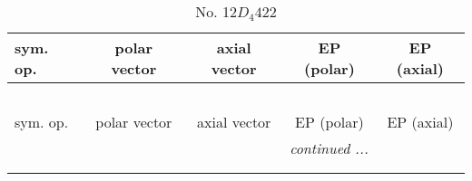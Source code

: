 \documentclass[fleqn,10pt,landscape]{jsarticle}
\begin{document}
\begin{center}
\renewcommand{\arraystretch}{1.3}
\begin{longtable}{lcccc}
\caption{No. 12\quad$D_{4}$\quad$422$\quad[ tetragonal ]}
 \\
 \hline \hline
sym. op. & polar vector & axial vector & EP (polar) & EP (axial) \\ \hline \endfirsthead

\multicolumn{4}{l}{\tablename\ \thetable{}} \\
 \hline \hline
sym. op. & polar vector & axial vector & EP (polar) & EP (axial) \\ \hline \endhead

 \hline \hline
\multicolumn{4}{r}{\footnotesize\it continued ...} \\ \endfoot

 \hline \hline
\multicolumn{4}{r}{} \\ \endlastfoot


\end{longtable}
\end{center}
\end{document}
